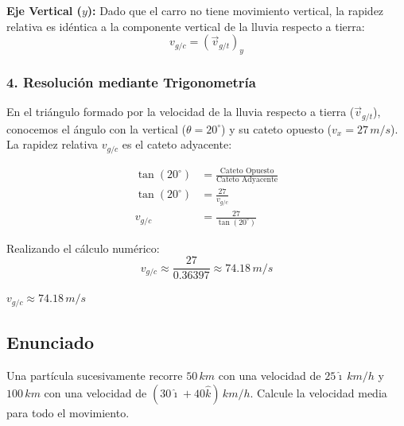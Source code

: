 \documentclass[12pt, a4paper]{article}
\begin{document}
\textbf{Eje Vertical ($y$):}
Dado que el carro no tiene movimiento vertical, la rapidez relativa es idéntica a la componente vertical de la lluvia respecto a tierra:
\begin{equation}
    v_{g/c} = (\vec{v}_{g/t})_y
\end{equation}

\subsubsection*{4. Resolución mediante Trigonometría}

En el triángulo formado por la velocidad de la lluvia respecto a tierra ($\vec{v}_{g/t}$), conocemos el ángulo con la vertical ($\theta = 20^\circ$) y su cateto opuesto ($v_x = 27 \, \si{m/s}$). La rapidez relativa $v_{g/c}$ es el cateto adyacente:

\begin{align*}
    \tan(20^\circ) &= \frac{\text{Cateto Opuesto}}{\text{Cateto Adyacente}} \\
    \tan(20^\circ) &= \frac{27}{v_{g/c}} \\
    v_{g/c} &= \frac{27}{\tan(20^\circ)}
\end{align*}

Realizando el cálculo numérico:
\begin{equation}
    v_{g/c} \approx \frac{27}{0.36397} \approx 74.18 \, \si{m/s}
\end{equation}

\begin{tcolorbox}[colback=blue!5!white, colframe=blue!75!black, title=Respuesta Final]
\centering
\Large $v_{g/c} \approx 74.18 \, \si{m/s}$
\end{tcolorbox}

\newpage

\subsection*{Enunciado}

Una partícula sucesivamente recorre $50 \, \si{km}$ con una velocidad de $25 \hat{\imath} \, \si{km/h}$ y $100 \, \si{km}$ con una velocidad de $(30 \hat{\imath} + 40 \hat{k}) \, \si{km/h}$. Calcule la velocidad media para todo el movimiento.
\end{document}
